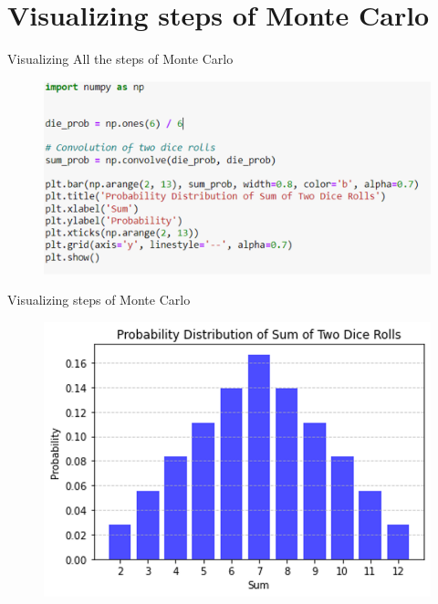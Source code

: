 \documentclass{beamer}
\begin{document}
    \section{Visualizing steps of Monte Carlo}
    \begin{frame}[fragile]{Visualizing All the steps of Monte Carlo}
        \begin{figure}
            \centering
            \includegraphics[width=\linewidth]{figures/code1.png}
        \end{figure}
    \end{frame}

    \begin{frame}{Visualizing steps of Monte Carlo}
        \begin{figure}
            \centering
            \includegraphics[width=0.8\linewidth]{figures/graph1.png}
        \end{figure}
    \end{frame}
\end{document}
